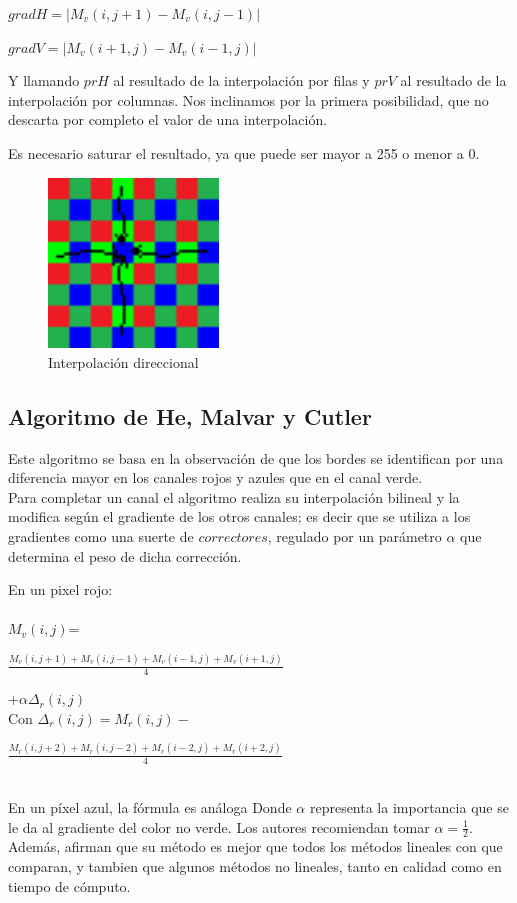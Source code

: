 \documentclass[a4paper]{article}
\begin{document}
$gradH=|M_{v}(i,j+1)-M_{v}(i,j-1)|$

$gradV=|M_{v}(i+1,j)-M_{v}(i-1,j)|$

Y llamando $prH$ al resultado de la interpolación por filas y $prV$ al resultado de la interpolación por columnas. Nos inclinamos por la primera posibilidad, que no descarta por completo el valor de una interpolación.

Es necesario saturar el resultado, ya que puede ser mayor a 255 o menor a 0.

\begin{figure}[htbp]
\centering
\includegraphics[width=128pt]{img/BA2.png}       %
\caption{Interpolación direccional}
\end{figure}

\subsection {Algoritmo de He, Malvar y Cutler}

Este algoritmo se basa en la observación de que los bordes se identifican por una diferencia mayor en los canales rojos y azules que en el canal verde.\\
Para completar un canal el algoritmo realiza su interpolación bilineal y la modifica según el gradiente de los otros canales; es decir que se utiliza a los gradientes como una suerte de $correctores$, regulado por un parámetro $\alpha$ que determina el peso de dicha corrección.

En un pixel rojo:\\ \\

$M_v(i,j)$= \begin{Large}$\frac{M_v(i,j+1)+M_v(i,j-1)+M_v(i-1,j)+M_v(i+1,j)}{4}$\end{Large} $ +\alpha \Delta_r(i,j) $\\

Con 
$\Delta_r(i,j) = M_r(i,j)-$\begin{Large}$\frac{M_r(i,j+2)+M_r(i,j-2)+M_r(i-2,j)+M_r(i+2,j)}{4} $
\end{Large}\\
En un píxel azul, la fórmula es análoga
Donde $\alpha$ representa la importancia que se le da al gradiente del color no verde. Los autores recomiendan tomar $\alpha=\frac{1}{2}$. Además, afirman que su método es mejor que todos los métodos lineales con que comparan, y tambien que algunos métodos no lineales, tanto en calidad como en tiempo de cómputo.
\end{document}
